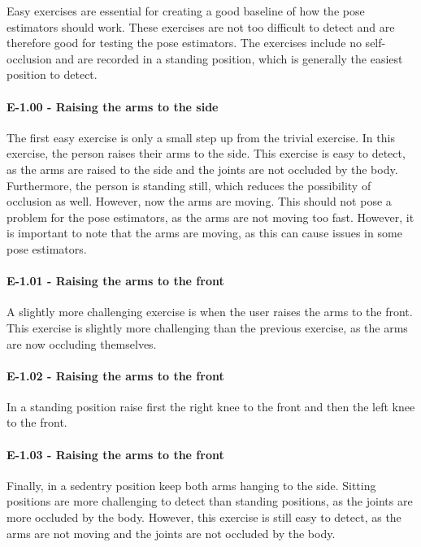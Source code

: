 Easy exercises are essential for creating a good baseline of how the pose estimators should work. These exercises are not too difficult to detect and are therefore good for testing the pose estimators. The exercises include no self-occlusion and are recorded in a standing position, which is generally the easiest position to detect.

\paragraph{E-1.00 - Raising the arms to the side}

The first easy exercise is only a small step up from the trivial exercise. In this exercise, the person raises their arms to the side. This exercise is easy to detect, as the arms are raised to the side and the joints are not occluded by the body. Furthermore, the person is standing still, which reduces the possibility of occlusion as well. However, now the arms are moving. This should not pose a problem for the pose estimators, as the arms are not moving too fast. However, it is important to note that the arms are moving, as this can cause issues in some pose estimators.

\paragraph{E-1.01 - Raising the arms to the front}

A slightly more challenging exercise is when the user raises the arms to the front. This exercise is slightly more challenging than the previous exercise, as the arms are now occluding themselves.

\paragraph{E-1.02 - Raising the arms to the front}

In a standing position raise first the right knee to the front and then the left knee to the front.  

\paragraph{E-1.03 - Raising the arms to the front}

Finally, in a sedentry position keep both arms hanging to the side. Sitting positions are more challenging to detect than standing positions, as the joints are more occluded by the body. However, this exercise is still easy to detect, as the arms are not moving and the joints are not occluded by the body.

